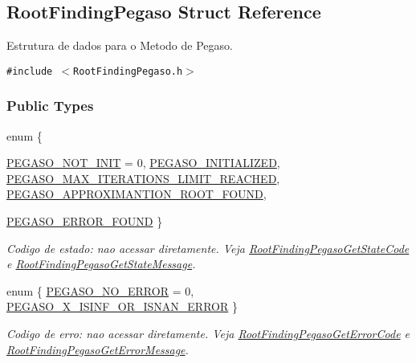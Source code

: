 \hypertarget{structRootFindingPegaso}{
\subsection{RootFindingPegaso Struct Reference}
\label{structRootFindingPegaso}
}
Estrutura de dados para o Metodo de Pegaso.  


{\tt \#include $<$RootFindingPegaso.h$>$}

\subsubsection*{Public Types}
\begin{CompactItemize}
\item 
enum \{ \par
\hyperlink{structRootFindingPegaso_42aeda2085b8adb7e28eea9973f2e522653fb2f0ef3335c1647b5a6a7c5538a6}{PEGASO\_\-NOT\_\-INIT} =  0, 
\hyperlink{structRootFindingPegaso_42aeda2085b8adb7e28eea9973f2e5224e6e8ac55887a935d5b6191bd136e450}{PEGASO\_\-INITIALIZED}, 
\hyperlink{structRootFindingPegaso_42aeda2085b8adb7e28eea9973f2e52274ca2b7d7419966b3f85b610bd88efe5}{PEGASO\_\-MAX\_\-ITERATIONS\_\-LIMIT\_\-REACHED}, 
\hyperlink{structRootFindingPegaso_42aeda2085b8adb7e28eea9973f2e522e3b9d752f7d3fd7577ff696e3d786121}{PEGASO\_\-APPROXIMANTION\_\-ROOT\_\-FOUND}, 
\par
\hyperlink{structRootFindingPegaso_42aeda2085b8adb7e28eea9973f2e522d0f56742bade13dc9e01dea9a1fa4c9b}{PEGASO\_\-ERROR\_\-FOUND}
 \}
\begin{CompactList}\small\item\em Codigo de estado: nao acessar diretamente. Veja \hyperlink{group____pegaso_g83892750b865aa977fcdba83922ad6fb}{RootFindingPegasoGetStateCode} e \hyperlink{group____pegaso_g2328683ae067772b11e3127fe800448d}{RootFindingPegasoGetStateMessage}. \item\end{CompactList}\item 
enum \{ \hyperlink{structRootFindingPegaso_7696162d3b2a9cbc51b25b197fd15c97533ab94376981d2770a69664285fe1bb}{PEGASO\_\-NO\_\-ERROR} =  0, 
\hyperlink{structRootFindingPegaso_7696162d3b2a9cbc51b25b197fd15c9745bf7192792e1bb0b9b99f6e25efe900}{PEGASO\_\-X\_\-ISINF\_\-OR\_\-ISNAN\_\-ERROR}
 \}
\begin{CompactList}\small\item\em Codigo de erro: nao acessar diretamente. Veja \hyperlink{group____pegaso_g6b27d39dab4f225185c07eb6fbb22ff9}{RootFindingPegasoGetErrorCode} e \hyperlink{group____pegaso_g4d0abd516b71e0462de1b22ce896b87a}{RootFindingPegasoGetErrorMessage}. \item\end{CompactList}\end{CompactItemize}
